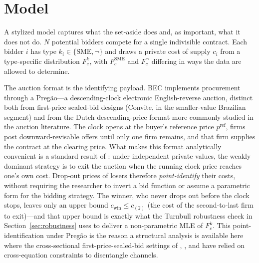 \section{Model}\label{sec:model}

A stylized model captures what the set-aside does and, as important, what it does not do. $N$ potential bidders compete for a single indivisible contract. Each bidder $i$ has type $k_i \in \{\text{SME}, \neg\}$ and draws a private cost of supply $c_i$ from a type-specific distribution $F_c^k$, with $F_c^{\text{SME}}$ and $F_c^{\neg}$ differing in ways the data are allowed to determine.

The auction format is the identifying payload. BEC implements procurement through a Preg\~ao---a descending-clock electronic English-reverse auction, distinct both from first-price sealed-bid designs (Convite, in the smaller-value Brazilian segment) and from the Dutch descending-price format more commonly studied in the auction literature. The clock opens at the buyer's reference price $p^{\mathrm{ref}}$, firms post downward-revisable offers until only one firm remains, and that firm supplies the contract at the clearing price. What makes this format analytically convenient is a standard result of \citet{haile2003}: under independent private values, the weakly dominant strategy is to exit the auction when the running clock price reaches one's own cost. Drop-out prices of losers therefore \emph{point-identify} their costs, without requiring the researcher to invert a bid function or assume a parametric form for the bidding strategy. The winner, who never drops out before the clock stops, leaves only an upper bound $c_{\text{win}} \le c_{(2)}$ (the cost of the second-to-last firm to exit)---and that upper bound is exactly what the Turnbull robustness check in Section~\ref{sec:robustness} uses to deliver a non-parametric MLE of $F_c^k$. This point-identification under Preg\~ao is the reason a structural analysis is available here where the cross-sectional first-price-sealed-bid settings of \citet{marion2007}, \citet{krasnokutskaya2011}, and \citet{atheyseira2011} have relied on cross-equation constraints to disentangle channels.

